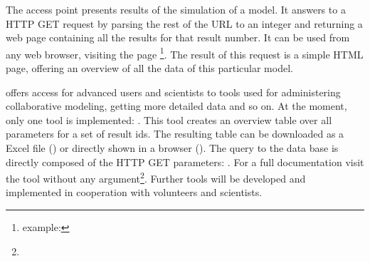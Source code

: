 The access point  presents results of the simulation of a model.
It answers to a HTTP GET request by parsing the rest of the URL to an integer and returning a web page containing all the results for that result number.
It can be used from any web browser, visiting the page \splurl[<result-id>]\footnote{example: \splurl[1337]}.
The result of this request is a simple HTML page, offering an overview of all the data of this particular model.

 offers access for advanced users and scientists to tools used for administering collaborative modeling, getting more detailed data and so on.
At the moment, only one tool is implemented: .
This tool creates an overview table over all parameters for a set of result ids.
The resulting table can be downloaded as a Excel file () or directly shown in a browser ().
The query to the data base is directly composed of the HTTP GET parameters:
\splurl[tools/ResultDataTable?6696,6904-7000\&type=html].
For a full documentation visit the tool without any argument\footnote{}.
Further tools will be developed and implemented in cooperation with volunteers and scientists.



